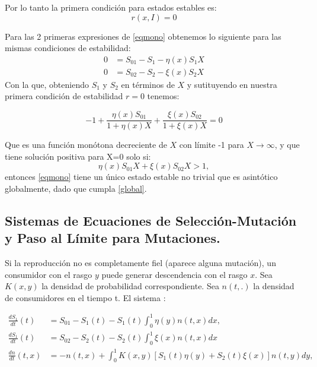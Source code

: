 	\normalsize{Por lo tanto la primera condici\'on para estados estables es:}
				\begin{equation*}
					r(x,I)=0
				\end{equation*}
				
\normalsize{Para las 2 primeras expresiones de \eqref{eqmono} obtenemos lo siguiente para las mismas condiciones de estabilidad:}
        \begin{equation*}
        \begin{split}
             0&=S_{01}-S_1-\eta(x)S_1X\\  0&=S_{02}-S_2-\xi(x)S_2X
        \end{split}
        \end{equation*}
				\normalsize{Con la que, obteniendo $S_1$ y $S_2$ en t\'erminos de $X$ y sutituyendo en nuestra primera condici\'on de estabilidad $r=0$ tenemos:}
				
				\begin{equation*}
					-1+\frac{\eta(x)S_{01}}{1+\eta(x)X}+\frac{\xi(x)S_{02}}{1+\xi(x)X}=0
				\end{equation*}
				
        \normalsize{Que es una funci\'on mon\'otona decreciente de $X$ con l\'imite -1 para $X\to\infty$, y que tiene soluci\'on positiva para X=0 solo si:}
        \begin{equation}\label{global}
            \eta(x)S_{01}X+\xi(x)S_{02}X>1,
        \end{equation}
			\normalsize{entonces \eqref{eqmono} tiene un \'unico estado estable no trivial que es asint\'otico globalmente, dado que cumpla \eqref{global}.}

		\subsection{Sistemas de Ecuaciones de Selección-Mutación y Paso al Límite para Mutaciones.}

        \normalsize{Si la reproducción no es completamente fiel (aparece alguna mutaci\'on), un consumidor con el rasgo $y$ puede generar descendencia con el rasgo $x$. Sea $K(x,y)$ la densidad de probabilidad correspondiente. Sea $n(t,.)$ la densidad de consumidores en el tiempo t. El sistema \citep{dieckman2005}:}

        \begin{equation}\label{core}
            \begin{split}
                \frac{d S_1}{dt}(t)&=S_{01}-S_1(t)-S_1(t)\int_{0}^{1}\eta(y)n(t,x)dx,\\
               \frac{d S_1}{dt}(t)&=S_{02}-S_2(t)-S_2(t)\int_{0}^{1}\xi(x)n(t,x)dx\\
              \frac{d n}{dt}(t,x)&=-n(t,x)+\int_{0}^{1}K(x,y)[S_1(t)\eta(y)+S_2(t)\xi(x)]n(t,y)dy,
            \end{split}
        \end{equation}

